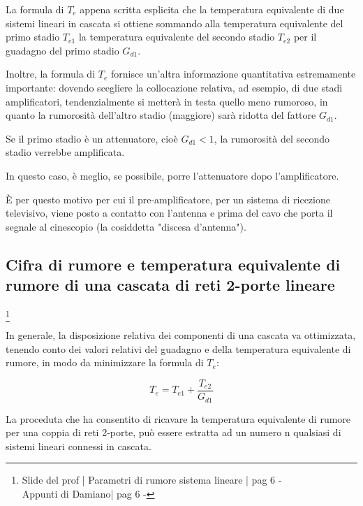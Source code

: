 La formula di $T_e$ appena scritta esplicita che la temperatura equivalente di due sistemi lineari in cascata 
si ottiene sommando alla temperatura equivalente del primo stadio $T_{e1}$ la temperatura equivalente del secondo stadio $T_{e2}$ per il guadagno del primo stadio $G_{d1}$. \newline 

Inoltre, la formula di $T_e$ fornisce un'altra informazione quantitativa estremamente importante: 
dovendo scegliere la collocazione relativa, ad esempio, di due stadi amplificatori, 
tendenzialmente si metterà in testa quello meno rumoroso, 
in quanto la rumorosità dell'altro stadio (maggiore) sarà ridotta del fattore $G_{d1}$. \newline 

Se il primo stadio è un attenuatore, cioè $G_{d1} < 1$, la rumorosità del secondo stadio verrebbe amplificata. \newline 

In questo caso, è meglio, se possibile, porre l'attenuatore dopo l'amplificatore. \newline 

È per questo motivo per cui il pre-amplificatore, 
per un sistema di ricezione televisivo, 
viene posto a contatto con l'antenna e prima del cavo che porta il segnale al cinescopio (la cosiddetta "discesa d'antenna"). \newline 

\newpage 

\subsection{Cifra di rumore e temperatura equivalente di rumore di una cascata di reti 2-porte lineare }
\footnote{Slide del prof | Parametri di rumore sistema lineare | pag 6 - \\  
Appunti di Damiano| pag 6 - } 

In generale, la disposizione relativa dei componenti di una cascata va ottimizzata, 
tenendo conto dei valori relativi del guadagno e della temperatura equivalente di rumore, 
in modo da minimizzare la formula di $T_e$: 

{
    \Large 
    \begin{equation}
            T_e
            =
            T_{e1} + \frac{T_{e2}}{G_{d1}}
    \end{equation}
}

La proceduta che ha consentito di ricavare la temperatura equivalente di rumore per una coppia di reti 2-porte, 
può essere estratta ad un numero n qualsiasi di sistemi lineari connessi in cascata. \newline 

